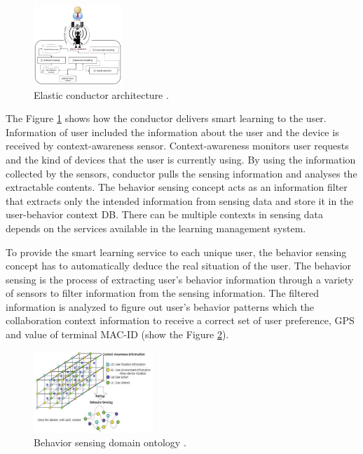 \documentclass[journal]{vgtc}
\begin{document}
  \begin{figure}[t]
    \centering
    \includegraphics[width=0.3\textwidth]{elastic-conductor}
    \caption{Elastic conductor architecture \cite{Kim2013}.}
    \label{elastic-conductor}
  \end{figure}

  The Figure \ref{elastic-conductor} shows how the conductor delivers smart learning to the user. Information of user included the information about the user and the device is received by context-awareness sensor. Context-awareness monitors user requests and the kind of devices that the user is currently using. By using the information collected by the sensors, conductor pulls the sensing information and analyses the extractable contents. The behavior sensing concept acts as an information filter that extracts only the intended information from sensing data and store it in the user-behavior context DB. There can be multiple contexts in sensing data depends on the services available in the learning management system.

  To provide the smart learning service to each unique user, the behavior sensing concept has to automatically deduce the real situation of the user. The behavior sensing is the process of extracting user's behavior information through a variety of sensors to filter information from the sensing information. The filtered information is analyzed to figure out user's behavior patterns which the collaboration context information to receive a correct set of user preference, GPS and value of terminal MAC-ID (show the Figure \ref{behaviour-sensing}).

  \begin{figure}[t]
    \centering
    \includegraphics[width=0.4\textwidth]{behaviour-sensing}
    \caption{Behavior sensing domain ontology \cite{Kim2013}.}
    \label{behaviour-sensing}
  \end{figure}
\end{document}
